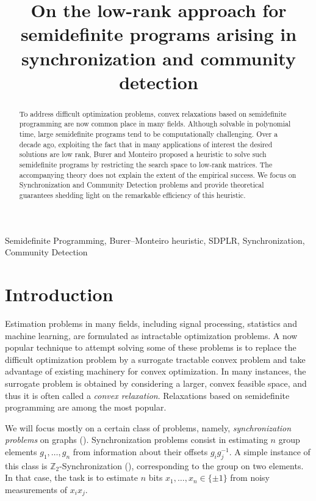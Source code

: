 \documentclass{colt2016} %
\title[The low-rank approach for certain semidefinite programs]{On the low-rank approach for semidefinite programs arising in synchronization and community detection}
\newcommand{\1}{\mathbf{1}}
\newcommand{\ZZ}{\mathbb{Z}}
\begin{document}
\maketitle

\begin{abstract}
To address difficult optimization problems, convex relaxations based on semidefinite programming are now common place in many fields. Although solvable in polynomial time, large semidefinite programs tend to be computationally challenging. Over a decade ago, exploiting the fact that in many applications of interest the desired solutions are low rank, Burer and Monteiro proposed a heuristic to solve such semidefinite programs by restricting the search space to low-rank matrices. The accompanying theory does not explain the extent of the empirical success. We focus on Synchronization and Community Detection problems and provide theoretical guarantees shedding light on the remarkable efficiency of this heuristic. 
\end{abstract}

\begin{keywords}
Semidefinite Programming, Burer--Monteiro heuristic, SDPLR, Synchronization, Community Detection
\end{keywords}


\section{Introduction}

Estimation problems in many fields, including signal processing, statistics and machine learning, are formulated as intractable optimization problems. A now popular technique to attempt solving some of these problems is to replace the difficult optimization problem by a surrogate tractable convex problem and take advantage of existing machinery for convex optimization. In many instances, the surrogate problem is obtained by considering a larger, convex feasible space, and thus it is often called a \textit{convex relaxation}. Relaxations based on semidefinite programming are among the most popular. %


We will focus mostly on a certain class of problems, namely, \emph{synchronization problems} on graphs (\cite{singer2010angular,bandeira2015nonuniquegames}). Synchronization problems consist in estimating $n$ group elements $g_1,\dots,g_n$ from information about their offsets $g_i^{}g_j^{-1}$. A simple instance of this class is $\ZZ_2$-Synchronization (\cite{abbe2014decoding}), corresponding to the group on two elements. In that case, the task is to estimate $n$ bits $x_1,\dots,x_n\in\{\pm1\}$ from noisy measurements of $x_ix_j$.
\end{document}
